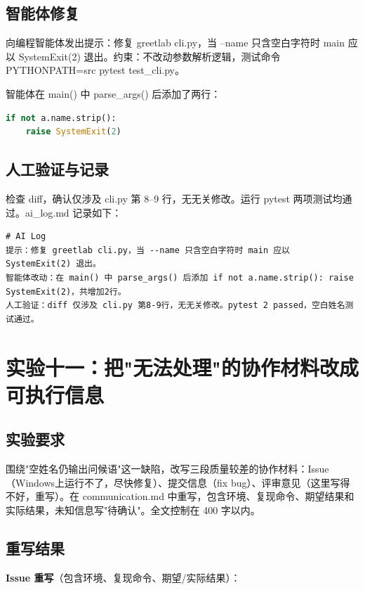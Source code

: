 \documentclass[UTF8]{ctexart}
\begin{document}
\subsection{智能体修复}

向编程智能体发出提示：修复 greetlab cli.py，当 --name 只含空白字符时 main 应以 SystemExit(2) 退出。约束：不改动参数解析逻辑，测试命令 PYTHONPATH=src pytest test\_cli.py。

智能体在 main() 中 parse\_args() 后添加了两行：

\begin{lstlisting}[language=Python]
if not a.name.strip():
    raise SystemExit(2)
\end{lstlisting}

\subsection{人工验证与记录}

检查 diff，确认仅涉及 cli.py 第 8--9 行，无无关修改。运行 pytest 两项测试均通过。ai\_log.md 记录如下：

\begin{lstlisting}
# AI Log
提示：修复 greetlab cli.py，当 --name 只含空白字符时 main 应以 SystemExit(2) 退出。
智能体改动：在 main() 中 parse_args() 后添加 if not a.name.strip(): raise SystemExit(2)，共增加2行。
人工验证：diff 仅涉及 cli.py 第8-9行，无无关修改。pytest 2 passed，空白姓名测试通过。
\end{lstlisting}

\section{实验十一：把"无法处理"的协作材料改成可执行信息}

\subsection{实验要求}

围绕"空姓名仍输出问候语"这一缺陷，改写三段质量较差的协作材料：Issue（Windows上运行不了，尽快修复）、提交信息（fix bug）、评审意见（这里写得不好，重写）。在 communication.md 中重写，包含环境、复现命令、期望结果和实际结果，未知信息写"待确认"。全文控制在 400 字以内。

\subsection{重写结果}

\textbf{Issue 重写}（包含环境、复现命令、期望/实际结果）：
\end{document}
